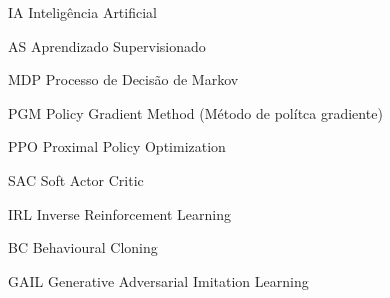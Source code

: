\documentclass[
	12pt,					%
	openright,				%
	twoside,					%
	a4paper,					%
	english,					%
	brazil					%
	]{abntex2}
\begin{document}
\frenchspacing

\pretextual



\imprimirfolhaderosto*



% 

% 







\listoffigures*
\cleardoublepage

\listoftables*
\cleardoublepage

\begin{siglas}
  \item[IA] Inteligência Artificial
  \item[AS] Aprendizado Supervisionado
  \item[MDP] Processo de Decisão de Markov
  \item[PGM] Policy Gradient Method (Método de polítca gradiente)
  \item[PPO] Proximal Policy Optimization
  \item[SAC] Soft Actor Critic
  \item[IRL] Inverse Reinforcement Learning
  \item[BC]  Behavioural Cloning
  \item[GAIL] Generative Adversarial Imitation Learning
\end{siglas}
\end{document}

